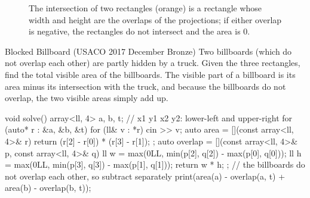 \begin{figure}[htbp]
\centering
{}
\caption{The intersection of two rectangles (orange) is a rectangle whose width and height are the overlaps of the
projections; if either overlap is negative, the rectangles do not intersect and the area is 0.}
\label{fig:rectinter}
\end{figure}

\begin{problem}{Blocked Billboard (USACO 2017 December Bronze)}
Two billboards (which do not overlap each other) are partly hidden by a truck. Given the three rectangles, find the total
visible area of the billboards.
\solution The visible part of a billboard is its area minus its intersection with the truck, and because the billboards do not
overlap, the two visible areas simply add up.
\end{problem}

\begin{code}
void solve() {
    array<ll, 4> a, b, t;  // x1 y1 x2 y2: lower-left and upper-right
    for (auto* r : {&a, &b, &t})
        for (ll& v : *r) cin >> v;
    auto area = [](const array<ll, 4>& r) {
        return (r[2] - r[0]) * (r[3] - r[1]);
    };
    auto overlap = [](const array<ll, 4>& p, const array<ll, 4>& q) {
        ll w = max(0LL, min(p[2], q[2]) - max(p[0], q[0]));
        ll h = max(0LL, min(p[3], q[3]) - max(p[1], q[1]));
        return w * h;
    };
    // the billboards do not overlap each other, so subtract separately
    print(area(a) - overlap(a, t) + area(b) - overlap(b, t));
}
\end{code}

